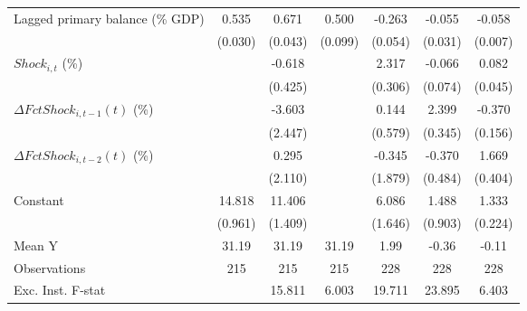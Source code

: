 {\begin{tabular}{l*{6}{c}}
\addlinespace
Lagged primary balance (\% GDP)&       0.535\sym{***}&       0.671\sym{***}&       0.500\sym{***}&      -0.263\sym{***}&      -0.055         &      -0.058\sym{***}\\
                    &     (0.030)         &     (0.043)         &     (0.099)         &     (0.054)         &     (0.031)         &     (0.007)         \\
\addlinespace
$ Shock_{i,t}$ (\%) &                     &      -0.618         &                     &       2.317\sym{***}&      -0.066         &       0.082\sym{*}  \\
                    &                     &     (0.425)         &                     &     (0.306)         &     (0.074)         &     (0.045)         \\
\addlinespace
$ \Delta FctShock_{i,t-1}(t)$ (\%)&                     &      -3.603         &                     &       0.144         &       2.399\sym{***}&      -0.370\sym{**} \\
                    &                     &     (2.447)         &                     &     (0.579)         &     (0.345)         &     (0.156)         \\
\addlinespace
$ \Delta FctShock_{i,t-2}(t)$ (\%)&                     &       0.295         &                     &      -0.345         &      -0.370         &       1.669\sym{***}\\
                    &                     &     (2.110)         &                     &     (1.879)         &     (0.484)         &     (0.404)         \\
\addlinespace
Constant            &      14.818\sym{***}&      11.406\sym{***}&                     &       6.086\sym{***}&       1.488         &       1.333\sym{***}\\
                    &     (0.961)         &     (1.409)         &                     &     (1.646)         &     (0.903)         &     (0.224)         \\
\midrule
Mean Y              &       31.19         &       31.19         &       31.19         &        1.99         &       -0.36         &       -0.11         \\
Observations        &         215         &         215         &         215         &         228         &         228         &         228         \\
Exc. Inst. F-stat   &                     &      15.811         &       6.003         &      19.711         &      23.895         &       6.403         \\
\bottomrule
\end{tabular}
}
